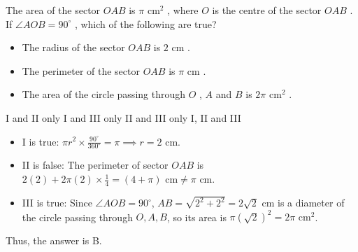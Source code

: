 \question The area of the sector $OAB$ is $\pi\text{ cm}^2$ , where $O$ is the centre of the sector $OAB$ . If $\angle AOB = 90^\circ$ , which of the following are true?
\begin{itemize}
    \item[I.] The radius of the sector $OAB$ is $2\text{ cm}$ .
    \item[II.] The perimeter of the sector $OAB$ is $\pi\text{ cm}$ .
    \item[III.] The area of the circle passing through $O$ , $A$ and $B$ is $2\pi\text{ cm}^2$ .
\end{itemize}
\begin{choices}
    \choice I and II only
    \correctchoice I and III only
    \choice II and III only
    \choice I, II and III
\end{choices}
\begin{solution}
\begin{itemize}
    \item I is true: $\pi r^2 \times \frac{90^\circ}{360^\circ} = \pi \implies r = 2\text{ cm}$.
    \item II is false: The perimeter of sector $OAB$ is $2(2) + 2\pi(2)\times\frac{1}{4} = (4 + \pi)\text{ cm} \ne \pi\text{ cm}$.
    \item III is true: Since $\angle AOB = 90^\circ$, $AB = \sqrt{2^2 + 2^2} = 2\sqrt{2}\text{ cm}$ is a diameter of the circle passing through $O, A, B$, so its area is $\pi(\sqrt{2})^2 = 2\pi\text{ cm}^2$.
\end{itemize}
Thus, the answer is B.
\end{solution}